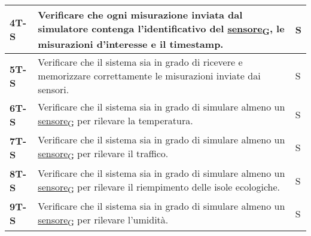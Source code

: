 \begin{longtable}{|>{\raggedright\arraybackslash}m{}|>{\raggedright\arraybackslash}m{}|>{\raggedright\arraybackslash}m{}|}
	\hline
	\textbf{4T-S}   & Verificare che ogni misurazione inviata dal simulatore contenga l’identificativo del \href{https://7last.github.io/docs/pb/documentazione-interna/glossario\#sensore}{sensore\textsubscript{G}}, le misurazioni d'interesse e il timestamp.                                                                                                                                                              & S              \\
	\hline
	\textbf{5T-S}   & Verificare che il sistema sia in grado di ricevere e memorizzare correttamente le misurazioni inviate dai sensori.                                                                                                                                                                                                                                                                                       & S              \\
	\hline
	\textbf{6T-S}   & Verificare che il sistema sia in grado di simulare almeno un \href{https://7last.github.io/docs/pb/documentazione-interna/glossario\#sensore}{sensore\textsubscript{G}} per rilevare la temperatura.                                                                                                                                                                                                     & S              \\
	\hline
	\textbf{7T-S}   & Verificare che il sistema sia in grado di simulare almeno un \href{https://7last.github.io/docs/pb/documentazione-interna/glossario\#sensore}{sensore\textsubscript{G}} per rilevare il traffico.                                                                                                                                                                                                        & S              \\
	\hline
	\textbf{8T-S}   & Verificare che il sistema sia in grado di simulare almeno un \href{https://7last.github.io/docs/pb/documentazione-interna/glossario\#sensore}{sensore\textsubscript{G}} per rilevare il riempimento delle isole ecologiche.                                                                                                                                                                              & S              \\
	\hline
	\textbf{9T-S}   & Verificare che il sistema sia in grado di simulare almeno un \href{https://7last.github.io/docs/pb/documentazione-interna/glossario\#sensore}{sensore\textsubscript{G}} per rilevare l'umidità.                                                                                                                                                                                                          & S              \\

\end{longtable}
